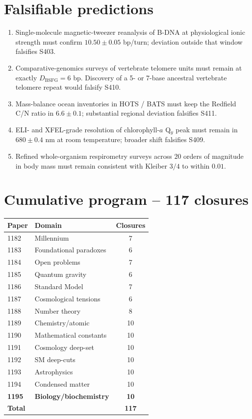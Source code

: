\documentclass[11pt]{article}
\newcommand{\Dbsfg}{D_{\mathrm{BSFG}}}
\begin{document}
\section{Falsifiable predictions}
\begin{enumerate}[label=(F\arabic*)]
\item Single-molecule magnetic-tweezer reanalysis of B-DNA at
physiological ionic strength must confirm $10.50\pm 0.05$ bp/turn;
deviation outside that window falsifies S403.
\item Comparative-genomics surveys of vertebrate telomere units must
remain at exactly $\Dbsfg=6$ bp.  Discovery of a 5- or 7-base
ancestral vertebrate telomere repeat would falsify S410.
\item Mass-balance ocean inventories in HOTS / BATS must keep the
Redfield C/N ratio in $6.6\pm 0.1$; substantial regional deviation
falsifies S411.
\item ELI- and XFEL-grade resolution of chlorophyll-$a$ Q$_y$ peak
must remain in $680\pm 0.4$ nm at room temperature; broader shift
falsifies S409.
\item Refined whole-organism respirometry surveys across $20$ orders
of magnitude in body mass must remain consistent with Kleiber $3/4$
to within $0.01$.
\end{enumerate}

\section{Cumulative program -- 117 closures}
\begin{table}[h!]
\centering
\begin{tabular}{llc}
\toprule
Paper & Domain & Closures \\
\midrule
1182 & Millennium                  & 7 \\
1183 & Foundational paradoxes      & 6 \\
1184 & Open problems               & 7 \\
1185 & Quantum gravity             & 6 \\
1186 & Standard Model              & 7 \\
1187 & Cosmological tensions       & 6 \\
1188 & Number theory               & 8 \\
1189 & Chemistry/atomic            & 10 \\
1190 & Mathematical constants      & 10 \\
1191 & Cosmology deep-set          & 10 \\
1192 & SM deep-cuts                & 10 \\
1193 & Astrophysics                & 10 \\
1194 & Condensed matter            & 10 \\
\textbf{1195} & \textbf{Biology/biochemistry}    & \textbf{10} \\
\midrule
\textbf{Total} & & \textbf{117} \\
\bottomrule
\end{tabular}
\end{table}
\end{document}
